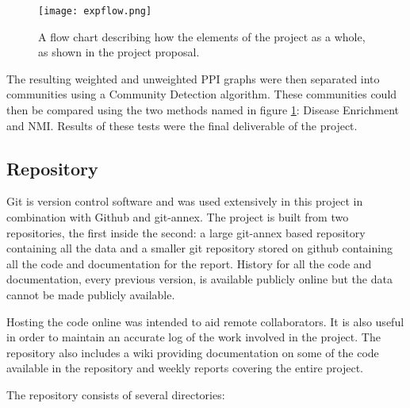 \begin{figure}
    \centering
    \texttt{[image: expflow.png]}
    \caption{A flow chart describing how the elements of the project as a whole, as shown in the project proposal.}
    \label{fig:expflow}
\end{figure}

The resulting weighted and unweighted PPI graphs were then separated into communities using a Community Detection algorithm.
These communities could then be compared using the two methods named in figure \ref{fig:expflow}: Disease Enrichment and NMI.
Results of these tests were the final deliverable of the project.

\subsection{Repository}

Git is version control software and was used extensively in this project in combination with Github\autocite{github} and git-annex\autocite{gitannex}.
The project is built from two repositories, the first inside the second: a large git-annex based repository containing all the data and a smaller git repository stored on github containing all the code and documentation for the report\autocite{opencast-bio}.
History for all the code and documentation, every previous version, is available publicly online but the data cannot be made publicly available.

Hosting the code online was intended to aid remote collaborators.
It is also useful in order to maintain an accurate log of the work involved in the project.
The repository also includes a wiki\autocite{opencastbiowiki} providing documentation on some of the code available in the repository and weekly reports covering the entire project.

The repository consists of several directories:

